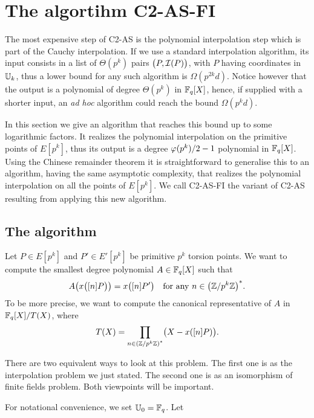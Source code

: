 \section{The algortihm C2-AS-FI}
\label{sec:C2-AS-FI}

The most expensive step of C2-AS is the polynomial interpolation step
which is part of the Cauchy interpolation. If we use a standard
interpolation algorithm, its input consists in a list of $\Theta(p^k)$
pairs $\bigl(P, \mathcal{I}(P)\bigr)$, with $P$ having coordinates in $\mathbb{U}_k$,
thus a lower bound for any such algorithm is $\Omega(p^{2k}d)$. Notice
however that the output is a polynomial of degree $\Theta(p^k)$ in
$\mathbb{F}_q[X]$, hence, if supplied with a shorter input, an \emph{ad hoc}
algorithm could reach the bound $\Omega(p^kd)$.

In this section we give an algorithm that reaches this bound up to
some logarithmic factors. It realizes the polynomial interpolation on
the primitive points of $E[p^k]$, thus its output is a degree
$\varphi(p^k)/2-1$ polynomial in $\mathbb{F}_q[X]$. Using the Chinese remainder
theorem it is straightforward to generalise this to an algorithm,
having the same asymptotic complexity, that realizes the polynomial
interpolation on all the points of $E[p^k]$. We call C2-AS-FI the
variant of C2-AS resulting from applying this new algorithm.


\subsection{The algorithm}
Let $P\in E[p^k]$ and $P'\in E'[p^k]$ be primitive $p^k$ torsion
points. We want to compute the smallest degree polynomial
$A\in\mathbb{F}_q[X]$ such that
\begin{equation}
  A\bigl(x\bigl([n]P\bigr)\bigr) = x\bigl([n]P'\bigr)
  \quad\text{for any $n\in\left(\mathbb{Z}/p^k\mathbb{Z}\right)^\ast$.}
\end{equation}
To be more precise, we want to compute the canonical representative of
$A$ in $\mathbb{F}_q[X]/T(X)$, where
\begin{equation}
  T(X) = \prod_{n\in\left(\mathbb{Z}/p^k\mathbb{Z}\right)^\ast} \bigl(X - x([n]P)\bigr)
  \text{.}
\end{equation}
 
There are two equivalent ways to look at this problem. The first one
is as the interpolation problem we just stated. The second one is as
an isomorphism of finite fields problem. Both viewpoints will be
important.

For notational convenience, we set $\mathbb{U}_0=\mathbb{F}_q$.  Let

